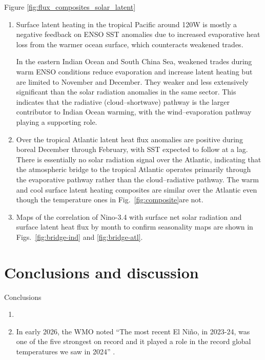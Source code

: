 \documentclass[aspectratio=169,xcolor=dvipsnames]{beamer}
\begin{document}
\begin{frame}{Figure \ref{fig:flux_composites_solar_latent}}
\begin{enumerate}
  \item Surface latent heating in the tropical Pacific around 120W is
    mostly a negative feedback on ENSO SST anomalies due to increased
    evaporative heat loss from the warmer ocean surface, which
    counteracts weakened trades.

    In the eastern Indian Ocean and South China Sea, weakened trades
    during warm ENSO conditions reduce evaporation and increase latent
    heating but are limited to November and December. They weaker and
    less extensively significant than the solar radiation anomalies in
    the same sector. This indicates that the radiative
    (cloud--shortwave) pathway is the larger contributor to Indian
    Ocean warming, with the wind--evaporation pathway playing a
    supporting role.

  \item Over the tropical Atlantic latent heat flux anomalies are
    positive during boreal December through February, with SST
    expected to follow at a lag. There is essentially no solar
    radiation signal over the Atlantic, indicating that the
    atmospheric bridge to the tropical Atlantic operates primarily
    through the evaporative pathway rather than the cloud--radiative
    pathway. The warm and cool surface latent heating composites are
    similar over the Atlantic even though the temperature ones in
    Fig.\ \ref{fig:composite}are not.

  \item Maps of the correlation of Nino-3.4 with surface net solar
    radiation and surface latent heat flux by month to confirm
    seasonality maps are shown in Figs.\ \ref{fig:bridge-ind} and
    \ref{fig:bridge-atl}.
  
\end{enumerate}
\end{frame}


\section{Conclusions and discussion}
\begin{frame}{Conclusions}
  \begin{enumerate}
  \item
  \item In early 2026, the WMO noted ``The most recent El Ni\~no, in
    2023-24, was one of the five strongest on record and it played a
    role in the record global temperatures we saw in 2024''
    \citep{WMO2026enso}.


    
  \end{enumerate}
\end{frame}
\end{document}
